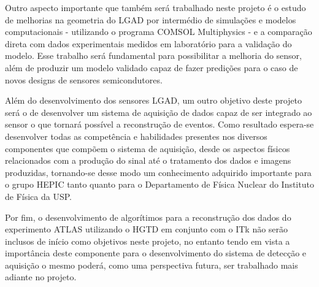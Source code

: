 Outro aspecto importante que também será trabalhado neste projeto é o estudo de melhorias na geometria do LGAD por intermédio de simulações e modelos computacionais - utilizando o programa COMSOL Multiphysics \cite{COMSOL} - e a comparação direta com dados experimentais medidos em laboratório para a validação do modelo. Esse trabalho será fundamental para possibilitar a melhoria do sensor, além de produzir um modelo validado capaz de fazer predições para o caso de novos designs de sensores semicondutores. 

Além do desenvolvimento dos sensores LGAD, um outro objetivo deste projeto será o de desenvolver um sistema de aquisição de dados capaz de ser integrado ao sensor o que tornará possível a reconstrução de eventos. Como resultado espera-se desenvolver todas as competência e habilidades presentes nos diversos componentes que compõem o sistema de aquisição, desde os aspectos físicos relacionados com a produção do sinal até o tratamento dos dados e imagens produzidas, tornando-se desse modo um conhecimento adquirido importante para o grupo HEPIC tanto quanto para o Departamento de Física Nuclear do Instituto de Física da USP.

Por fim, o desenvolvimento de algorítimos para a reconstrução dos dados do experimento ATLAS utilizando o HGTD em conjunto com o ITk não serão inclusos de início como objetivos neste projeto, no entanto tendo em vista a importância deste componente para o desenvolvimento do sistema de detecção e aquisição o mesmo poderá, como uma perspectiva futura, ser trabalhado mais adiante no projeto. %

